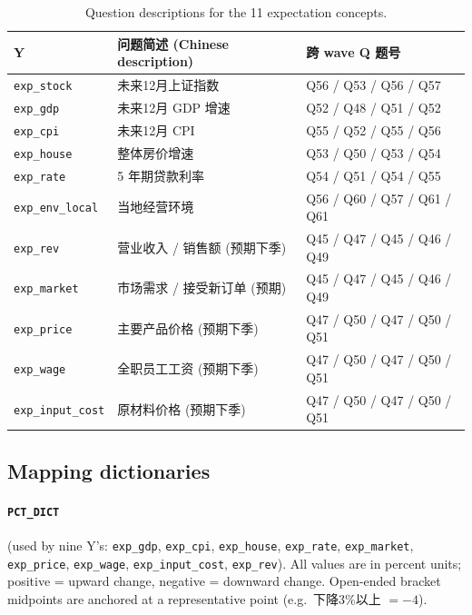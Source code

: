 \documentclass[11pt,letterpaper,english,final]{article}
\begin{document}
\begin{table}[H]
\centering
\small
\caption{Question descriptions for the 11 expectation concepts.}
\label{tab:q_descriptions}
\begin{tabular}{p{2.4cm} p{8.5cm} l}
\toprule
Y & 问题简述 (Chinese description) & 跨 wave Q 题号 \\
\midrule
\texttt{exp\_stock}    & 未来12月上证指数            & Q56 / Q53 / Q56 / Q57 \\
\texttt{exp\_gdp}      & 未来12月 GDP 增速           & Q52 / Q48 / Q51 / Q52 \\
\texttt{exp\_cpi}      & 未来12月 CPI                & Q55 / Q52 / Q55 / Q56 \\
\texttt{exp\_house}    & 整体房价增速                & Q53 / Q50 / Q53 / Q54 \\
\texttt{exp\_rate}     & 5 年期贷款利率              & Q54 / Q51 / Q54 / Q55 \\
\texttt{exp\_env\_local}  & 当地经营环境                & Q56 / Q60 / Q57 / Q61 / Q61 \\
\texttt{exp\_rev}      & 营业收入 / 销售额 (预期下季)  & Q45 / Q47 / Q45 / Q46 / Q49 \\
\texttt{exp\_market}   & 市场需求 / 接受新订单 (预期)   & Q45 / Q47 / Q45 / Q46 / Q49 \\
\texttt{exp\_price}    & 主要产品价格 (预期下季)     & Q47 / Q50 / Q47 / Q50 / Q51 \\
\texttt{exp\_wage}     & 全职员工工资 (预期下季)     & Q47 / Q50 / Q47 / Q50 / Q51 \\
\texttt{exp\_input\_cost} & 原材料价格 (预期下季)     & Q47 / Q50 / Q47 / Q50 / Q51 \\
\bottomrule
\end{tabular}
\end{table}

\subsection{Mapping dictionaries}

\paragraph{\texttt{PCT\_DICT}} (used by nine Y's: \texttt{exp\_gdp}, \texttt{exp\_cpi}, \texttt{exp\_house}, \texttt{exp\_rate}, \texttt{exp\_market}, \texttt{exp\_price}, \texttt{exp\_wage}, \texttt{exp\_input\_cost}, \texttt{exp\_rev}).
All values are in percent units; positive = upward change, negative = downward change. Open-ended bracket midpoints are anchored at a representative point (e.g.\ 下降3\%以上 $= -4$).
\end{document}
